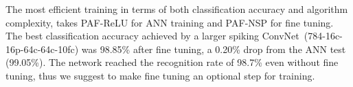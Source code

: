 \documentclass[10pt,journal,compsoc]{IEEEtran}
\begin{document}
	
	
	
	
	The most efficient training in terms of both classification accuracy and algorithm complexity, takes PAF-ReLU for ANN training and PAF-NSP for fine tuning.
	The best classification accuracy achieved by a larger spiking ConvNet~(784-16c-16p-64c-64c-10fc) was 98.85\% after fine tuning, a 0.20\% drop from the ANN test (99.05\%).
	The network reached the recognition rate of 98.7\% even without fine tuning, thus we suggest to make fine tuning an optional step for training.
\end{document}
